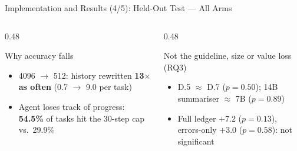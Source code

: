 \documentclass[aspectratio=169,10pt]{beamer}
\begin{document}
\begin{frame}{Implementation and Results (4/5): Held-Out Test --- All Arms}
\vspace{0.2cm}
\begin{columns}[T]
\begin{column}{0.48\textwidth}
\begin{block}{Why accuracy falls}
\footnotesize
\begin{itemize}
  \item 4096 $\to$ 512: history rewritten \textbf{13$\times$ as often}
        (0.7 $\to$ 9.0 per task)
  \item Agent loses track of progress: \textbf{54.5\%} of tasks hit the
        30-step cap vs.\ 29.9\%
\end{itemize}
\end{block}
\end{column}
\begin{column}{0.48\textwidth}
\begin{alertblock}{Not the guideline, size or value loss (RQ3)}
\footnotesize
\begin{itemize}
  \item D.5 $\approx$ D.7 ($p=0.50$); 14B summariser $\approx$ 7B ($p=0.89$)
  \item Full ledger $+$7.2 ($p=0.13$), errors-only $+$3.0 ($p=0.58$): not significant
\end{itemize}
\end{alertblock}
\end{column}
\end{columns}
\end{frame}
\end{document}
